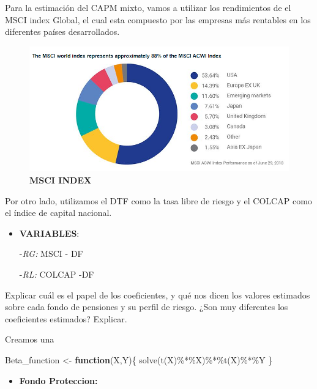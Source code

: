 \documentclass[
  12pt,
]{article}
\newenvironment{Shaded}{\begin{snugshade}}{\end{snugshade}}
\newcommand{\ControlFlowTok}[1]{\textcolor[rgb]{0.13,0.29,0.53}{\textbf{#1}}}
\newcommand{\FunctionTok}[1]{\textcolor[rgb]{0.00,0.00,0.00}{#1}}
\newcommand{\NormalTok}[1]{#1}
\newcommand{\OtherTok}[1]{\textcolor[rgb]{0.56,0.35,0.01}{#1}}
\newcommand{\SpecialCharTok}[1]{\textcolor[rgb]{0.00,0.00,0.00}{#1}}
\providecommand{\tightlist}{%
  \setlength{\itemsep}{0pt}\setlength{\parskip}{0pt}}
\begin{document}
Para la estimación del CAPM mixto, vamos a utilizar los rendimientos de
el MSCI index Global, el cual esta compuesto por las empresas más
rentables en los diferentes países desarrollados.

\begin{figure}
\centering
\includegraphics{Imagenes/index.png}
\caption{\textbf{MSCI INDEX}}
\end{figure}

Por otro lado, utilizamos el DTF como la tasa libre de riesgo y el
COLCAP como el índice de capital nacional.

\begin{itemize}
\item
  \textbf{VARIABLES}:

  -\emph{RG:} MSCI - DF

  -\emph{RL:} COLCAP -DF
\end{itemize}

Explicar cuál es el papel de los coeficientes, y qué nos dicen los
valores estimados sobre cada fondo de pensiones y su perfil de riesgo.
¿Son muy diferentes los coeficientes estimados? Explicar.

Creamos una

\begin{Shaded}
\begin{Highlighting}[]
\NormalTok{Beta\_function }\OtherTok{\textless{}{-}} \ControlFlowTok{function}\NormalTok{(X,Y)\{}
  \FunctionTok{solve}\NormalTok{(}\FunctionTok{t}\NormalTok{(X)}\SpecialCharTok{\%*\%}\NormalTok{X)}\SpecialCharTok{\%*\%}\FunctionTok{t}\NormalTok{(X)}\SpecialCharTok{\%*\%}\NormalTok{Y}
\NormalTok{\} }
\end{Highlighting}
\end{Shaded}

\begin{itemize}
\tightlist
\item
  \textbf{Fondo Proteccion:}
\end{itemize}
\end{document}
